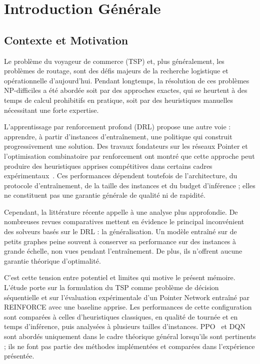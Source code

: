 \documentclass[12pt, a4paper, twoside, openright]{book}
\begin{document}
	\chapter*{Introduction G\'en\'erale}
	
\section*{Contexte et Motivation}

Le problème du voyageur de commerce (TSP) et, plus généralement, les problèmes de routage, sont des défis majeurs de la recherche logistique et opérationnelle d'aujourd'hui. Pendant longtemps, la résolution de ces problèmes NP-difficiles a été abordée soit par des approches exactes, qui se heurtent à des temps de calcul prohibitifs en pratique, soit par des heuristiques manuelles nécessitant une forte expertise.

L'apprentissage par renforcement profond (DRL) propose une autre voie : apprendre, à partir d'instances d'entraînement, une politique qui construit progressivement une solution. Des travaux fondateurs sur les réseaux Pointer et l'optimisation combinatoire par renforcement ont montré que cette approche peut produire des heuristiques apprises compétitives dans certains cadres expérimentaux~\cite{vinyals2015pointer,bello2016neural}. Ces performances dépendent toutefois de l'architecture, du protocole d'entraînement, de la taille des instances et du budget d'inférence ; elles ne constituent pas une garantie générale de qualité ni de rapidité.

Cependant, la littérature récente appelle à une analyse plus approfondie. De nombreuses revues comparatives mettent en évidence le principal inconvénient des solveurs basés sur le DRL : la généralisation. Un modèle entraîné sur de petits graphes peine souvent à conserver sa performance sur des instances à grande échelle, non vues pendant l'entraînement. De plus, ils n'offrent aucune garantie théorique d'optimalité.

C'est cette tension entre potentiel et limites qui motive le présent mémoire. L'étude porte sur la formulation du TSP comme problème de décision séquentielle et sur l'évaluation expérimentale d'un Pointer Network entraîné par REINFORCE avec une baseline apprise. Les performances de cette configuration sont comparées à celles d'heuristiques classiques, en qualité de tournée et en temps d'inférence, puis analysées à plusieurs tailles d'instances. PPO~\cite{schulman2017proximal} et DQN sont abordés uniquement dans le cadre théorique général lorsqu'ils sont pertinents ; ils ne font pas partie des méthodes implémentées et comparées dans l'expérience présentée.
\end{document}

